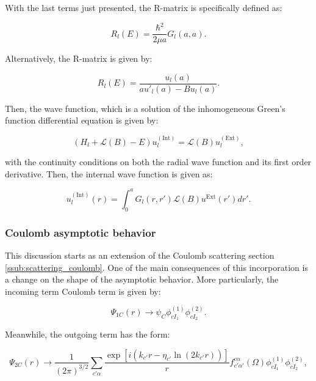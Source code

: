 \documentclass[openany]{book}
\begin{document}
With the last terms just presented, the R-matrix is specifically defined as: 

\begin{equation}\label{rmatrix_Bloch_rmatrix}
	R_l(E) = \frac{\hbar^2}{2\mu a} G_l(a, a).
\end{equation} 

Alternatively, the R-matrix is given by:

\begin{equation}\label{rmatrix_u_rmatrix}
	R_l(E) =  \frac{u_l(a)}{au'_{l}(a) - Bu_l(a)}.
\end{equation} 

Then, the wave function, which is a solution of the inhomogeneous Green's function differential equation is given by:

\begin{equation}\label{rmatrix_BlochSchrodinger_inhomogeneous}
	(H_l + \mathcal{L}(B) - E)u^{\mathrm{(Int)}}_l = \mathcal{L}(B) u^{\mathrm{(Ext)}}_l ,
\end{equation}

with the continuity conditions on both the radial wave function and its first order derivative. Then, the internal wave function is given as:

\begin{equation}\label{rmatrix_Bloch_internalWaveFunction}
	u^{(\mathrm{Int})}_l(r) = \int_{0}^{a} G_l(r, r') \mathcal{L}(B) u^{\mathrm{Ext}} (r') dr'.
\end{equation} 


\subsubsection{Coulomb asymptotic behavior} \label{ssub:rmatrix_calculable_coulomb}

This discussion starts as an extension of the Coulomb scattering section \ref{ssub:scattering_coulomb}. One of the main consequences of this incorporation is a change on the shape of the asymptotic behavior. More particularly, the incoming term Coulomb term is given by:

 \begin{equation}\label{rmatrix_channels_incomingCoulomb}
 	\Psi_{1C}(r) \rightarrow  \psi_C\phi^{(1)}_{cI_1} \phi^{(2)}_{cI_2}.
 \end{equation}

Meanwhile, the outgoing term has the form:


\begin{equation}\label{rmatrix_channels_outgoing}
	\Psi_{2C}(r) \rightarrow \frac{1}{(2\pi)^{3/2}} \sum_{c' \alpha} \frac{\exp {[i(k_{c'}r - \eta_{c'} \ln {(2k_{c'}r )})]}}{r} f^{c\alpha}_{c'\alpha'}(\Omega)  \phi^{(1)}_{cI_1} \phi^{(2)}_{cI_2},
\end{equation}
\end{document}
